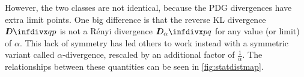 \documentclass[twoside]{article}
\theoremstyle{plain}
\theoremstyle{definition}
\newcommand{\thickD}{I\mkern-8muD}
\newcommand{\kldiv}{\thickD\infdivx}
\newcommand{\V}{\mathcal V}
\begin{document}
However, the two classes are not identical, because the PDG divergences have extra limit points. 
One big difference is that the reverse KL divergence $\kldiv q p$ is not a R\'enyi divergence $\thickD_\alpha\infdivx p q$ for any value (or limit) of $\alpha$.
This lack of symmetry has led others \parencite[e.g.,][]{cichocki2010families}
to work instead with a symmetric variant called $\alpha$-divergence, rescaled by an additional factor of $\frac1\alpha$.
The relationships between these quantities can be seen in \cref{fig:statdistmap}.

%
\end{document}

